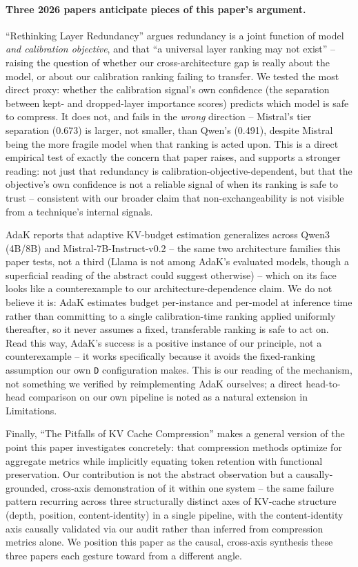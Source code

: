 \documentclass[11pt]{article}
\begin{document}
\paragraph{Three 2026 papers anticipate pieces of this paper's argument.}
``Rethinking Layer Redundancy'' \citep{rethinkredundancy2026} argues
redundancy is a joint function of model \emph{and calibration objective},
and that ``a universal layer ranking may not exist'' -- raising the
question of whether our cross-architecture gap is really about the model,
or about our calibration ranking failing to transfer. We tested the most
direct proxy: whether the calibration signal's own confidence (the
separation between kept- and dropped-layer importance scores) predicts
which model is safe to compress. It does not, and fails in the
\emph{wrong} direction -- Mistral's tier separation (0.673) is larger, not
smaller, than Qwen's (0.491), despite Mistral being the more fragile model
when that ranking is acted upon. This is a direct empirical test of
exactly the concern that paper raises, and supports a stronger reading:
not just that redundancy is calibration-objective-dependent, but that the
objective's own confidence is not a reliable signal of when its ranking is
safe to trust -- consistent with our broader claim that non-exchangeability
is not visible from a technique's internal signals.

AdaK \citep{adak2026} reports that adaptive KV-budget estimation
generalizes across Qwen3 (4B/8B) and Mistral-7B-Instruct-v0.2 -- the same
two architecture families this paper tests, not a third (Llama is not
among AdaK's evaluated models, though a superficial reading of the
abstract could suggest otherwise) -- which on its face looks like a
counterexample to our architecture-dependence claim. We do not believe it
is: AdaK estimates budget per-instance and per-model at inference time
rather than committing to a single calibration-time ranking applied
uniformly thereafter, so it never assumes a fixed, transferable ranking is
safe to act on. Read this way, AdaK's success is a positive instance of
our principle, not a counterexample -- it works specifically because it
avoids the fixed-ranking assumption our own \texttt{D} configuration
makes. This is our reading of the mechanism, not something we verified by
reimplementing AdaK ourselves; a direct head-to-head comparison on our own
pipeline is noted as a natural extension in Limitations.

Finally, ``The Pitfalls of KV Cache Compression'' \citep{pitfallskv2026}
makes a general version of the point this paper investigates concretely:
that compression methods optimize for aggregate metrics while implicitly
equating token retention with functional preservation. Our contribution is
not the abstract observation but a causally-grounded, cross-axis
demonstration of it within one system -- the same failure pattern
recurring across three structurally distinct axes of KV-cache structure
(depth, position, content-identity) in a single pipeline, with the
content-identity axis causally validated via our audit rather than
inferred from compression metrics alone. We position this paper as the
causal, cross-axis synthesis these three papers each gesture toward from a
different angle.
\end{document}
